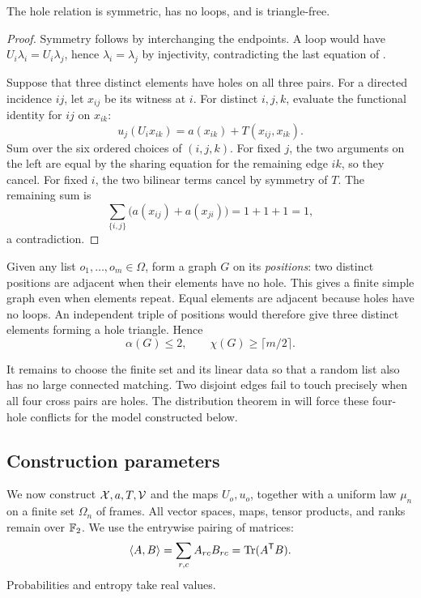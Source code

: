 \begin{lemma}\label{lem:hole-triangle-free}
The hole relation is symmetric, has no loops, and is triangle-free.
\end{lemma}
\begin{proof}
Symmetry follows by interchanging the endpoints.
A loop would have \(U_i\lambda_i=U_i\lambda_j\), hence
\(\lambda_i=\lambda_j\) by injectivity, contradicting the last
equation of .

Suppose that three distinct elements have holes on all three pairs.
For a directed incidence \(ij\), let \(x_{ij}\) be its witness at
\(i\). For distinct \(i,j,k\), evaluate the functional identity for
\(ij\) on \(x_{ik}\):
\[
 u_j(U_ix_{ik})=a(x_{ik})+T(x_{ij},x_{ik}).
\]
Sum over the six ordered choices of \((i,j,k)\).
For fixed \(j\), the two arguments on the left are equal by the
sharing equation for the remaining edge \(ik\), so they cancel.
For fixed \(i\), the two bilinear terms cancel by symmetry of \(T\).
The remaining sum is
\[
 \sum_{\{i,j\}}\bigl(a(x_{ij})+a(x_{ji})\bigr)=1+1+1=1,
\]
a contradiction.
\end{proof}

Given any list \(o_1,\ldots,o_m\in\Omega\), form a graph \(G\)
on its \emph{positions}: two distinct positions are adjacent when
their elements have no hole. This gives a finite simple graph even
when elements repeat. Equal elements are adjacent because holes have
no loops. An independent triple of positions would therefore give
three distinct elements forming a hole triangle. Hence
\begin{equation}\label{eq:sample-independence}
 \alpha(G)\le2,\qquad \chi(G)\ge\lceil m/2\rceil.
\end{equation}

It remains to choose the finite set and its linear data so that a
random list also has no large connected matching. Two disjoint edges
fail to touch precisely when all four cross pairs are holes. The
distribution theorem in  will force these
four-hole conflicts for the model constructed below.

\subsection{Construction parameters}

We now construct \(\mathcal X,a,T,\mathcal V\) and the maps \(U_o,u_o\), together
with a uniform law \(\mu_n\) on a finite set \(\Omega_n\) of
frames. All vector spaces, maps, tensor products, and ranks remain over
\(\mathbb F_2\). We use the entrywise pairing of matrices:
\[
 \langle A,B\rangle=\sum_{r,c}A_{rc}B_{rc}=\operatorname{Tr}(A^{\mathsf T} B).
\]
Probabilities and entropy take real values.

